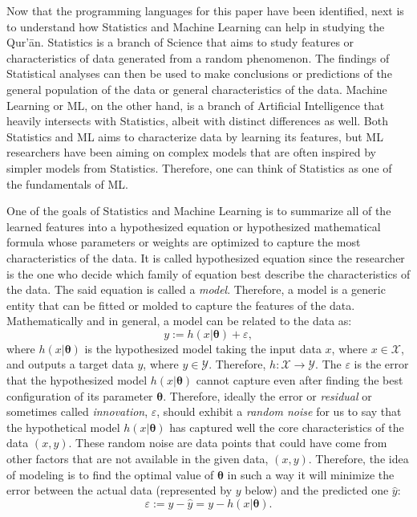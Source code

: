 Now that the programming languages for this paper have been identified, next is to understand how Statistics and Machine Learning can help in studying the Qur'\=an. Statistics is a branch of Science that aims to study features or characteristics of data generated from a random phenomenon. The findings of Statistical analyses can then be used to make conclusions or predictions of the general population of the data or general characteristics of the data. Machine Learning or ML, on the other hand, is a branch of Artificial Intelligence that heavily intersects with Statistics, albeit with distinct differences as well. Both Statistics and ML aims to characterize data by learning its features, but ML researchers have been aiming on complex models that are often inspired by simpler models from Statistics. Therefore, one can think of Statistics as one of the fundamentals of ML. 

One of the goals of Statistics and Machine Learning is to summarize all of the learned features into a hypothesized equation or hypothesized mathematical formula whose parameters or weights are optimized to capture the most characteristics of the data. It is called hypothesized equation since the researcher is the one who decide which family of equation best describe the characteristics of the data. The said equation is called a \textit{model}. Therefore, a model is a generic entity that can be fitted or molded to capture the features of the data. Mathematically and in general, a model can be related to the data as:
\begin{equation}\label{eq:general_model}
    y:=h(x|\boldsymbol{\theta})+\varepsilon,
\end{equation}
where $h(x|\boldsymbol{\theta})$ is the hypothesized model taking the input data $x$, where $x\in\mathscr{X}$, and outputs a target data $y$, where $y\in\mathscr{Y}$. Therefore, $h:\mathscr{X}\rightarrow\mathscr{Y}$. The $\varepsilon$ is the error that the hypothesized model $h(x|\boldsymbol{\theta})$ cannot capture even after finding the best configuration of its parameter $\boldsymbol{\theta}$. Therefore, ideally the error or \textit{residual} or sometimes called \textit{innovation}, $\varepsilon$, should exhibit a \textit{random noise} for us to say that the hypothetical model $h(x|\boldsymbol{\theta})$ has captured well the core characteristics of the data $(x,y)$. These random noise are data points that could have come from other factors that are not available in the given data, $(x,y)$. Therefore, the idea of modeling is to find the optimal value of $\boldsymbol{\theta}$ in such a way it will minimize the error between the actual data (represented by $y$ below) and the predicted one $\hat{y}$:
\begin{equation}
    \varepsilon:=y-\hat{y}=y-h(x|\boldsymbol{\theta}).
\end{equation}

